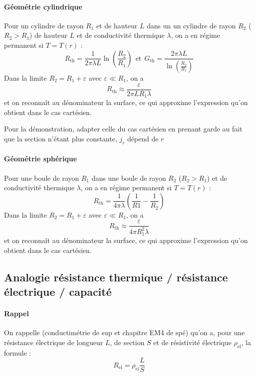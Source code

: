 \documentclass[french]{book}
\theoremstyle{plain}
\theoremstyle{definition}
\theoremstyle{remark}
\begin{document}
\paragraph{Géométrie cylindrique}
Pour un cylindre de rayon $R_1$ et de hauteur $L$ dans un un cylindre de rayon $R_2$ ($R_2>R_1$) de hauteur $L$ et de conductivité thermique $\lambda$, on a en régime permanent si $T=T(r)$ : $$R_\text{th}=\frac{1}{2\pi\lambda L}\ln\left(\frac{R_2}{R_1}\right)\ \ \text{et}\ \ G_\text{th}=\frac{2\pi \lambda L}{\displaystyle\ln\left(\frac{R_2}{R_1}\right)}$$ Dans la limite $R_2=R_1+\varepsilon$ avec $\varepsilon\ll R_1$, on a $$R_\text{th}\approx\frac{\varepsilon}{2\pi LR_1\lambda}$$ et on reconnaît au dénominateur la surface, ce qui approxime l'expression qu'on obtient dans le cas cartésien. \\ \par Pour la démonstration, adapter celle du cas cartésien en prenant garde au fait que la section n'étant plus constante, $j_r$ dépend de $r$

\paragraph{Géométrie sphérique}
Pour une boule de rayon $R_1$ dans une boule de rayon $R_2$ ($R_2>R_1$) et de conductivité thermique $\lambda$, on a en régime permanent si $T=T(r)$ : $$R_\text{th}=\frac{1}{4\pi\lambda}\left(\frac{1}{R1}-\frac{1}{R_2}\right)$$ Dans la limite $R_2=R_1+\varepsilon$ avec $\varepsilon\ll R_1$, on a $$R_\text{th}\approx\frac{\varepsilon}{4\pi R_1^2\lambda}$$ et on reconnaît au dénominateur la surface, ce qui approxime l'expression qu'on obtient dans le cas cartésien.

\subsection{Analogie résistance thermique / résistance électrique / capacité}

\paragraph{Rappel} On rappelle (conductimétrie de sup et chapitre EM4 de spé) qu'on a, pour une résistance électrique de longueur $L$, de section $S$ et de résistivité électrique $\rho_\text{el}$, la formule : $$R_\text{el}=\rho_\text{el}\frac{L}{S}$$
\end{document}
